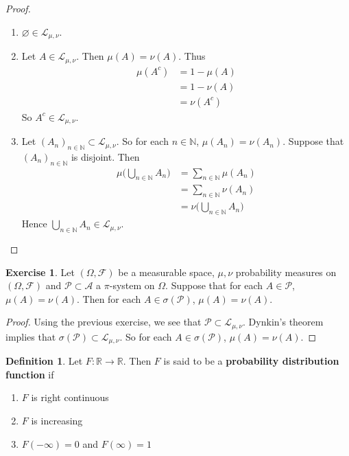 \documentclass[12pt]{amsart}
\theoremstyle{definition}
\newtheorem{defn}[definition]{Definition}
\newtheorem{ex}[definition]{Exercise}
\newcommand{\sig}{\sigma}
\newcommand{\Om}{\Omega}
\newcommand{\N}{\mathbb{N}}
\newcommand{\R}{\mathbb{R}}
\newcommand{\MA}{\mathcal{A}}
\newcommand{\MF}{\mathcal{F}}
\newcommand{\ML}{\mathcal{L}}
\newcommand{\MP}{\mathcal{P}}
\begin{document}
	\begin{proof}\
		\begin{enumerate}
			\item $\varnothing \in \ML_{\mu, \nu}$.
			\item Let $A \in \ML_{\mu, \nu}$. Then $\mu(A) = \nu(A)$. Thus 
			\begin{align*}
				\mu(A^c) 
				&= 1-\mu(A) \\
				&= 1 -\nu(A) \\
				&= \nu(A^c)
			\end{align*}
			So $A^c \in \ML_{\mu, \nu}$. 
			\item Let $(A_n)_{n \in \N} \subset \ML_{\mu, \nu}$. So for each $n \in \N$, $\mu(A_n) = \nu(A_n)$.  Suppose that $(A_n)_{n \in \N}$ is disjoint. Then 
			\begin{align*}
				\mu\bigg(\bigcup_{n \in \N} A_n\bigg) 
				&= \sum_{n \in \N} \mu(A_n) \\
				&= \sum_{n \in \N} \nu(A_n) \\
				&= \nu\bigg(\bigcup_{n \in \N} A_n\bigg) 
			\end{align*}
			Hence $\bigcup_{n \in \N} A_n \in \ML_{\mu, \nu}$.
		\end{enumerate}
	\end{proof}
	
	\begin{ex}
		Let $(\Om, \MF)$ be a measurable space, $\mu, \nu$ probability measures on $(\Om, \MF)$ and $\MP \subset \MA$ a $\pi$-system on $\Om$. Suppose that for each $A \in \MP$, $\mu(A) = \nu(A)$. Then for each $A \in \sig(\MP)$, $\mu(A) = \nu(A)$.
	\end{ex}
	
	\begin{proof}
		Using the previous exercise, we see that $\MP \subset \ML_{\mu, \nu}$. Dynkin's theorem implies that $\sig(\MP) \subset \ML_{\mu, \nu}$. So for each $A \in \sig(\MP)$, $\mu(A) = \nu(A)$.
	\end{proof}
	
	
	
	
	
	
	
	
	\begin{defn}
		Let $F: \R \rightarrow \R$. Then $F$ is said to be a \textbf{probability distribution function} if 
		\begin{enumerate}
			\item $F$ is right continuous
			\item $F$ is increasing
			\item $F(-\infty)  = 0$ and $F(\infty)  = 1$
		\end{enumerate}
	\end{defn}
	
\end{document}
